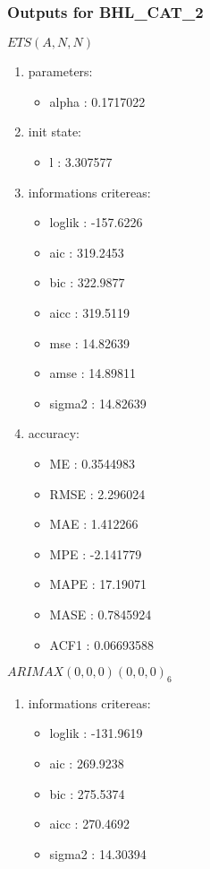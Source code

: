 \documentclass[10pt,a4paper]{article}\usepackage[]{graphicx}\usepackage[]{color}
\newcommand{\AaA}{\_}
\begin{document}
\subsubsection{Outputs for BHL\AaA CAT\AaA 2}
\begin{multicols}{2}


$ ETS(A,N,N) $
\begin{enumerate}
\item parameters:
\begin{itemize}
\item  alpha :  0.1717022 
\end{itemize}
\item init state:
\begin{itemize}
\item  l :  3.307577 
\end{itemize}
\item informations critereas:
\begin{itemize}
\item  loglik :  -157.6226 
\item  aic :  319.2453 
\item  bic :  322.9877 
\item  aicc :  319.5119 
\item  mse :  14.82639 
\item  amse :  14.89811 
\item  sigma2 :  14.82639 
\end{itemize}
\item accuracy:
\begin{itemize}
\item  ME :  0.3544983 
\item  RMSE :  2.296024 
\item  MAE :  1.412266 
\item  MPE :  -2.141779 
\item  MAPE :  17.19071 
\item  MASE :  0.7845924 
\item  ACF1 :  0.06693588 
\end{itemize}
\end{enumerate}

\columnbreak


 $ARIMAX(0,0,0)(0,0,0)_{6}$ 
\begin{enumerate}
\item informations critereas:
\begin{itemize}
\item  loglik :  -131.9619 
\item  aic :  269.9238 
\item  bic :  275.5374 
\item  aicc :  270.4692 
\item  sigma2 :  14.30394 
\end{itemize}


\end{enumerate}
\end{multicols}
\end{document}
